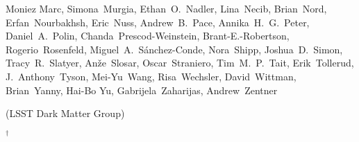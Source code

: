 \begin{raggedright}
Moniez Marc,
Simona~Murgia,
Ethan~O.~Nadler,
Lina~Necib,
Brian~Nord,
Erfan~Nourbakhsh,
Eric~Nuss,
Andrew~B.~Pace,
Annika~H.~G.~Peter,
Daniel~A.~Polin,
Chanda~Prescod-Weinstein,
Brant-E.-Robertson,
Rogerio~Rosenfeld,
Miguel~A.~S\'anchez-Conde,
Nora~Shipp,
Joshua~D.~Simon,
Tracy~R.~Slatyer,
An\v{z}e~Slosar,
Oscar~Straniero,
Tim~M.~P.~Tait,
Erik~Tollerud,
J.~Anthony~Tyson,
Mei-Yu~Wang,
Risa~Wechsler,
David~Wittman,
Brian~Yanny,
Hai-Bo Yu,
Gabrijela~Zaharijas,
Andrew~Zentner

\begin{center}
(LSST Dark Matter Group)
\end{center}

$^\dagger$ 

\begin{multicols}{2}
\scriptsize
\parskip=4pt



\end{multicols}
\end{raggedright}
